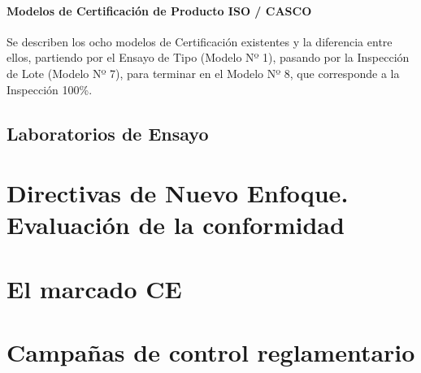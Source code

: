 \paragraph{Modelos de Certificación de Producto ISO / CASCO}

Se describen los ocho modelos de Certificación existentes y la diferencia entre ellos, partiendo por el Ensayo de Tipo (Modelo Nº 1), pasando por la Inspección de Lote (Modelo Nº 7), para terminar en el Modelo Nº 8, que corresponde a la Inspección 100\%.




\subsection{Laboratorios de Ensayo}


\section{Directivas de Nuevo Enfoque. Evaluación de la conformidad}

\section{El marcado CE}

\section{Campañas de control reglamentario}